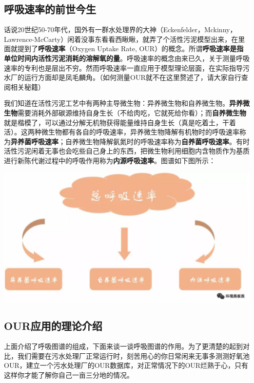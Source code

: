 \documentclass[]{book}
\begin{document}
\subsection{呼吸速率的前世今生}

话说20世纪50-70年代，国外有一群水处理界的大神（Eckenfelder，Mckinny，Lawrence-McCarty）闲着没事东看看西瞅瞅，就弄了个活性污泥模型出来，在里面就提到了\textbf{呼吸速率}（Oxygen
Uptake Rate,
OUR）的概念。所谓\textbf{呼吸速率是指单位时间内活性污泥消耗的溶解氧的量}。呼吸速率的概念由来已久，关于测量呼吸速率的专利也是层出不穷。然而呼吸速率一直应用于模型理论层面，在实际指导污水厂的运行方面却是凤毛麟角。（如何测量OUR就不在这里赘述了，请大家自行查阅相关秘籍）

我们知道在活性污泥工艺中有两种主导微生物：异养微生物和自养微生物。\textbf{异养微生物}需要消耗外部碳源维持自身生长（不给肉吃，它就死给你看）；而\textbf{自养微生物}就是楷模了，可以通过分解无机物获得能量维持自身生长（真是吃着土，干着活）。这两种微生物都有各自的呼吸速率，异养微生物降解有机物时的呼吸速率称为\textbf{异养菌呼吸速率}；自养微生物降解氨氮时的呼吸速率称为\textbf{自养菌呼吸速率}。有时活性污泥闲着无事也会吃些自己身上的东西，把微生物利用细胞内含物质作为基质进行新陈代谢过程中的呼吸作用称为\textbf{内源呼吸速率}。图谱如下图所示：

\includegraphics[width=6.67in]{images/os2}

\subsection{OUR应用的理论介绍}\label{our}

上面介绍了呼吸图谱的组成，下面来谈一谈呼吸图谱的作用。为了更清楚的起到对比，我们需要在污水处理厂正常运行时，刻苦用心的你日常闲来无事多测测好氧池OUR，建立一个污水处理厂的OUR数据库，对正常情况下的OUR烂熟于心，只有这样你才能了解你自己一亩三分地的情况。
\end{document}
